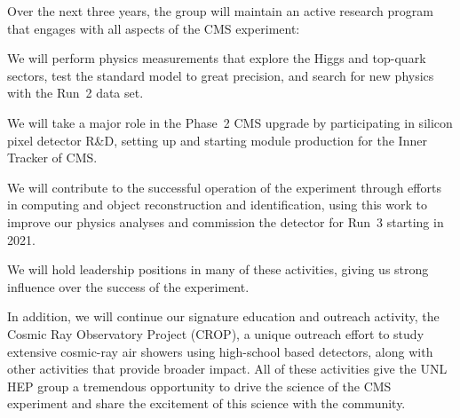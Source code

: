 Over the next three years, the group will maintain an active research program that engages with all aspects of the CMS experiment:

\vspace{-0.2cm}
\begin{packed_enum}
\item We will perform physics measurements that explore the Higgs and top-quark sectors, test the standard model to great precision, and search for new physics with the Run~2 data set.
\item We will take a major role in the Phase~2 CMS upgrade by participating in silicon pixel detector R\&D, setting up and starting module production for the Inner Tracker of CMS.
\item We will contribute to the successful operation of the experiment through efforts in computing and object reconstruction and identification, using this work to improve our physics analyses and commission the detector for Run~3 starting in 2021.
\item We will hold leadership positions in many of these activities, giving us strong influence over the success of the experiment.
\end{packed_enum}
\vspace{-0.2cm}

In addition, we will continue our signature education and outreach activity, the Cosmic Ray Observatory Project (CROP), a unique outreach effort to study extensive cosmic-ray air showers using high-school based detectors, along with other activities that provide broader impact.  All of these activities give the UNL HEP group a tremendous opportunity to drive the science of the CMS experiment and share the excitement of this science with the community.
